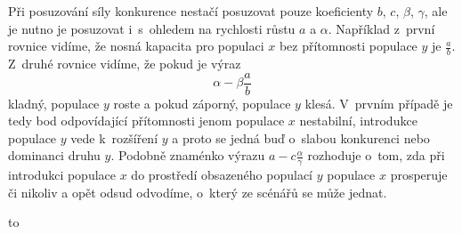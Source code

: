 \documentclass{article}
\begin{document}
\begin{multicols}
Při posuzování síly konkurence nestačí posuzovat pouze koeficienty
$b$, $c$, $\beta$, $\gamma$, ale je nutno je posuzovat i s ohledem na
rychlosti růstu $a$ a $\alpha$. Například z první rovnice vidíme, že
nosná kapacita pro populaci $x$ bez přítomnosti populace $y$ je
$\frac ab$. Z druhé rovnice vidíme, že pokud je výraz
$$\alpha - \beta \frac ab$$ kladný, populace $y$ roste a pokud záporný,
populace $y$ klesá. V prvním případě je tedy bod odpovídající
přítomnosti jenom populace $x$ nestabilní, introdukce populace $y$
vede k rozšíření $y$ a proto se jedná buď o slabou konkurenci nebo
dominanci druhu $y$. Podobně znaménko výrazu $a-c\frac\alpha\gamma$
rozhoduje o tom, zda při introdukci populace $x$ do prostředí
obsazeného populací $y$ populace $x$ prosperuje či nikoliv a opět
odsud odvodíme, o který ze scénářů se může jednat.

\end{multicols}

\hbox to 
\end{document}
